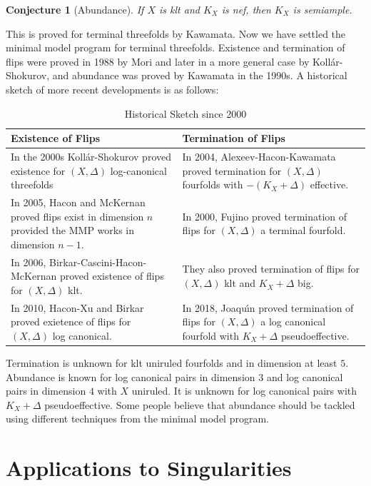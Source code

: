 \documentclass[leqno, openany]{memoir}
\newtheorem{conj}[thm]{Conjecture}
\theoremstyle{definition}
\theoremstyle{remark}
\theoremstyle{plain}
\theoremstyle{definition}
\theoremstyle{remark}
\begin{document}
\begin{conj}[Abundance]
    If $X$ is klt and $K_X$ is nef, then $K_X$ is semiample.
\end{conj}

This is proved for terminal threefolds by Kawamata. Now we have settled the minimal model program for terminal threefolds. Existence and termination of flips were proved in 1988 by Mori and later in a more general case by Koll\'ar-Shokurov, and abundance was proved by Kawamata in the 1990s. A historical sketch of more recent developments is as follows:

\begin{table}[H]
    \centering
    \caption{Historical Sketch since 2000}
    \label{tab:label}
    \begin{tabular}{p{}p{}}
    \toprule
    Existence of Flips & Termination of Flips \\
    \midrule
    In the 2000s Koll\'ar-Shokurov proved existence for $(X, \Delta)$ log-canonical threefolds & In 2004, Alexeev-Hacon-Kawamata proved termination for $(X, \Delta)$ fourfolds with $-(K_X + \Delta)$ effective. \\
    In 2005, Hacon and McKernan proved flips exist in dimension $n$ provided the MMP works in dimension $n-1$. & In 2000, Fujino proved termination of flips for $(X, \Delta)$ a terminal fourfold. \\
    In 2006, Birkar-Cascini-Hacon-McKernan proved existence of flips for $(X, \Delta)$ klt. & They also proved termination of flips for $(X, \Delta)$ klt and $K_X + \Delta$ big. \\
    In 2010, Hacon-Xu and Birkar proved exietence of flips for $(X, \Delta)$ log canonical. & In 2018, Joaqu\'{\i}n proved termination of flips for $(X, \Delta)$ a log canonical fourfold with $K_X + \Delta$ pseudoeffective. \\
    \bottomrule
    \end{tabular}
\end{table}

Termination is unknown for klt uniruled fourfolds and in dimension at least $5$. Abundance is known for log canonical pairs in dimension $3$ and log canonical pairs in dimension $4$ with $X$ uniruled. It is unknown for log canonical pairs with $K_X + \Delta$ pseudoeffective. Some people believe that abundance should be tackled using different techniques from the minimal model program.

\section{Applications to Singularities}%
\label{sec:applications_to_singularities}
\end{document}
